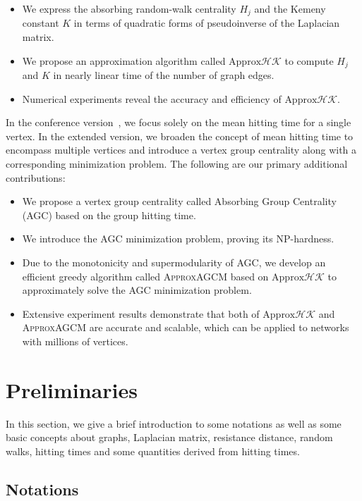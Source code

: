\documentclass[10pt,journal,compsoc,twocolumn,twoside]{IEEEtran}
\begin{document}
\begin{itemize}
    \item We express the absorbing random-walk centrality \(H_j\) and the Kemeny constant \(K\) in terms of quadratic forms of pseudoinverse of the Laplacian matrix.
    \item We propose an approximation algorithm called \(\text{Approx}\mathcal{HK}\) to compute \(H_j\) and \(K\) in nearly linear time of the number of graph edges.
    \item Numerical experiments reveal the accuracy and efficiency of \(\text{Approx}\mathcal{HK}\).
\end{itemize}

In the conference version~\cite{ZhXuZh20}, we focus solely on the mean hitting time for a single vertex.
In the extended version, we broaden the concept of mean hitting time to encompass multiple vertices and introduce a vertex group centrality along with a corresponding minimization problem.
The following are our primary additional contributions:

\begin{itemize}
    \item We propose a vertex group centrality called Absorbing Group Centrality (AGC) based on the group hitting time.
    \item We introduce the AGC minimization problem, proving its NP-hardness.
    \item Due to the monotonicity and supermodularity of AGC, we develop an efficient greedy algorithm called \textsc{ApproxAGCM} based on \(\text{Approx}\mathcal{HK}\) to approximately solve the AGC minimization problem.
    \item Extensive experiment results demonstrate that both of \(\text{Approx}\mathcal{HK}\) and \textsc{ApproxAGCM} are accurate and scalable, which can be applied to networks with millions of vertices.
\end{itemize}


\section{Preliminaries}

In this section, we give a brief introduction to some notations as well as some basic concepts about graphs, Laplacian matrix, resistance distance, random walks, hitting times and some quantities derived from hitting times.

\subsection{Notations}
\end{document}
